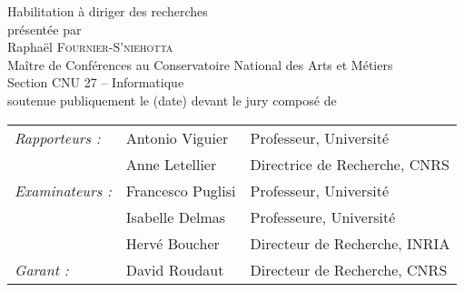 \begin{titlepage}
\begin{center}
    \vfill
\Huge
Habilitation à diriger des recherches\\[1ex]
\bigskip
\normalsize
présentée par \\[2ex]
\bigskip
{\huge Rapha\"el \textsc{Fournier-S'niehotta}}\\
\bigskip
Maître de Conférences au Conservatoire National des Arts et Métiers\\
Section CNU 27 -- Informatique\\[4ex]
\bigskip
\normalsize
\noindent soutenue publiquement le (date) devant le jury composé de~\\
    \bigskip    
\begin{tabular}{lll}
  \textit{Rapporteurs :}  & Antonio Viguier & Professeur, Université \\
                          & Anne Letellier & Directrice de Recherche, CNRS\\
  \textit{Examinateurs :} & Francesco Puglisi & Professeur, Université \\
                          & Isabelle Delmas & Professeure, Université \\
                          & Hervé Boucher & Directeur de Recherche, INRIA\\
  \textit{Garant :}	  & David Roudaut & Directeur de Recherche, CNRS\\
\end{tabular}
\end{center}


\end{titlepage}
\addtolength{\oddsidemargin}{5mm}
\addtolength{\textwidth}{-3mm}
\addtolength{\topmargin}{19mm}
